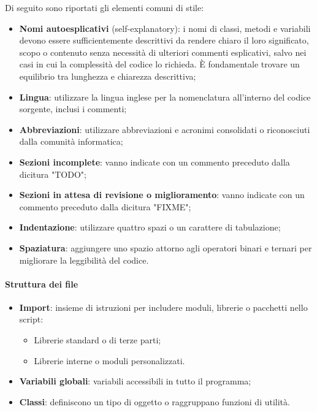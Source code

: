 \label{sec:elementi-comuni-stile}
\par Di seguito sono riportati gli elementi comuni di stile:
\begin{itemize}
  \item \textbf{Nomi autoesplicativi} (self-explanatory): i nomi di classi, metodi e variabili devono essere sufficientemente descrittivi da rendere chiaro il loro significato, scopo o contenuto senza necessità di ulteriori commenti esplicativi, salvo nei casi in cui la complessità del codice lo richieda. È fondamentale trovare un equilibrio tra lunghezza e chiarezza descrittiva;
  \item \textbf{Lingua}: utilizzare la lingua inglese per la nomenclatura all'interno del codice sorgente, inclusi i commenti;
  \item \textbf{Abbreviazioni}: utilizzare abbreviazioni e acronimi consolidati o riconosciuti dalla comunità informatica;
  \item \textbf{Sezioni incomplete}: vanno indicate con un commento preceduto dalla dicitura "TODO";
  \item \textbf{Sezioni in attesa di revisione o miglioramento}: vanno indicate con un commento preceduto dalla dicitura "FIXME";
  \item \textbf{Indentazione}: utilizzare quattro spazi o un carattere di tabulazione;
  \item \textbf{Spaziatura}: aggiungere uno spazio attorno agli operatori binari e ternari per migliorare la leggibilità del codice.
\end{itemize}

\paragraph*{Struttura dei file}
\begin{itemize}
  \item \textbf{Import}: insieme di istruzioni per includere moduli, librerie o pacchetti nello script:
  \begin{itemize}
    \item Librerie standard o di terze parti;
    \item Librerie interne o moduli personalizzati.
  \end{itemize}
  \item \textbf{Variabili globali}: variabili accessibili in tutto il programma;
  \item \textbf{Classi}: definiscono un tipo di oggetto o raggruppano funzioni di utilità.
\end{itemize}

